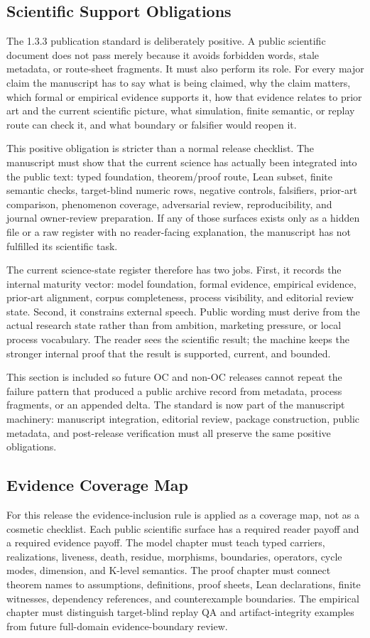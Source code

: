 \subsection{Scientific Support Obligations}
The 1.3.3 publication standard is deliberately positive. A public scientific document does not pass merely because it avoids forbidden words, stale metadata, or route-sheet fragments. It must also perform its role. For every major claim the manuscript has to say what is being claimed, why the claim matters, which formal or empirical evidence supports it, how that evidence relates to prior art and the current scientific picture, what simulation, finite semantic, or replay route can check it, and what boundary or falsifier would reopen it.

This positive obligation is stricter than a normal release checklist. The manuscript must show that the current science has actually been integrated into the public text: typed foundation, theorem/proof route, Lean subset, finite semantic checks, target-blind numeric rows, negative controls, falsifiers, prior-art comparison, phenomenon coverage, adversarial review, reproducibility, and journal owner-review preparation. If any of those surfaces exists only as a hidden file or a raw register with no reader-facing explanation, the manuscript has not fulfilled its scientific task.

The current science-state register therefore has two jobs. First, it records the internal maturity vector: model foundation, formal evidence, empirical evidence, prior-art alignment, corpus completeness, process visibility, and editorial review state. Second, it constrains external speech. Public wording must derive from the actual research state rather than from ambition, marketing pressure, or local process vocabulary. The reader sees the scientific result; the machine keeps the stronger internal proof that the result is supported, current, and bounded.

This section is included so future OC and non-OC releases cannot repeat the failure pattern that produced a public archive record from metadata, process fragments, or an appended delta. The standard is now part of the manuscript machinery: manuscript integration, editorial review, package construction, public metadata, and post-release verification must all preserve the same positive obligations.

\subsection{Evidence Coverage Map}
For this release the evidence-inclusion rule is applied as a coverage map, not as a cosmetic checklist. Each public scientific surface has a required reader payoff and a required evidence payoff. The model chapter must teach typed carriers, realizations, liveness, death, residue, morphisms, boundaries, operators, cycle modes, dimension, and K-level semantics. The proof chapter must connect theorem names to assumptions, definitions, proof sheets, Lean declarations, finite witnesses, dependency references, and counterexample boundaries. The empirical chapter must distinguish target-blind replay QA and artifact-integrity examples from future full-domain evidence-boundary review.

